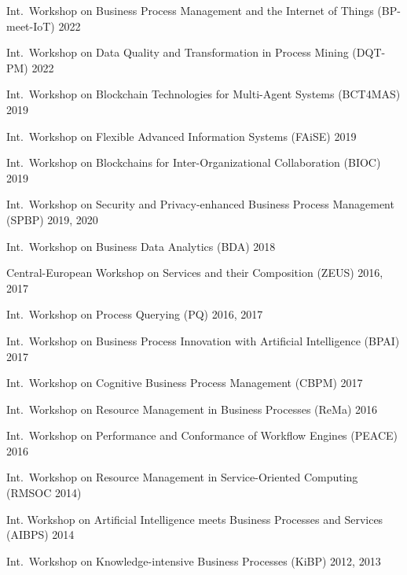 {{\begin{inparaitem}
			\item Int.\ Workshop on Business Process Management and the Internet of Things (BP-meet-IoT) 2022
			\item Int.\ Workshop on Data Quality and Transformation in Process Mining (DQT-PM) 2022
			\item Int.\ Workshop on Blockchain Technologies for Multi-Agent Systems (BCT4MAS) 2019
			\item Int.\ Workshop on Flexible Advanced Information Systems (FAiSE) 2019
			\item Int.\ Workshop on Blockchains for Inter-Organizational Collaboration (BIOC) 2019
			\item Int.\ Workshop on Security and Privacy-enhanced Business Process Management (SPBP) 2019, 2020
			\item Int.\ Workshop on Business Data Analytics (BDA) 2018
			\item Central-European Workshop on Services and their Composition (ZEUS) 2016, 2017
			\item Int.\ Workshop on Process Querying (PQ) 2016, 2017
			\item Int.\ Workshop on Business Process Innovation with Artificial Intelligence (BPAI) 2017
			\item Int.\ Workshop on Cognitive Business Process Management (CBPM) 2017
			\item Int.\ Workshop on Resource Management in Business Processes (ReMa) 2016
			\item Int.\ Workshop on Performance and Conformance of Workflow Engines (PEACE) 2016
			\item Int.\ Workshop on Resource Management in Service-Oriented Computing (RMSOC 2014)
			\item Int. Workshop on Artificial Intelligence meets Business Processes and Services (AIBPS) 2014
			\item Int.\ Workshop on Knowledge-intensive Business Processes (KiBP) 2012, 2013
		\end{inparaitem}
	}
}%
